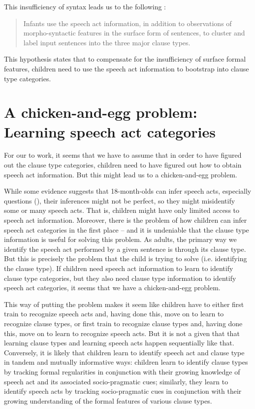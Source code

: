 This insufficiency of syntax leads us to the following \tbf{\subhypos{}}:
\begin{quote}
Infants use the speech act information, in addition to observations of morpho-syntactic features in the surface form of sentences, to cluster and label input sentences into the three major clause types.
\end{quote}


This hypothesis states that to compensate for the insufficiency of surface formal features, children need to use the speech act information to bootstrap into clause type categories.



\section{A chicken-and-egg problem: Learning speech act categories}
\label{sec:intro:sp}
For our \subhypos{} to work, it seems that we have to assume that in order to have figured out the clause type categories, children need to have figured out how to obtain speech act information. But this might lead us to a chicken-and-egg problem.

While some evidence suggests that 18-month-olds can infer speech acts, especially questions (\cite{casillas2017turn, marshmallowqueen}), their inferences might not be perfect, so they might misidentify some or many speech acts. That is, children might have only limited access to speech act information. Moreover, there is the problem of how children can infer speech act categories in the first place -- and it is undeniable that the clause type information is useful for solving this problem. As adults, the primary way we identify the speech act performed by a given sentence is through its clause type. But this is precisely the problem that the child is trying to solve (i.e. identifying the clause type). If children need speech act information to learn to identify clause type categories, but they also need clause type information to identify speech act categories, it seems that we have a chicken-and-egg problem. 

This way of putting the problem makes it seem like children have to either first train to recognize speech acts and, having done this, move on to learn to recognize clause types, or first train to recognize clause types and, having done this, move on to learn to recognize speech acts. But it is not a given that 
that learning clause types and learning speech acts happen sequentially like that. Conversely, it is likely that children learn to identify speech act and clause type in tandem and mutually informative ways: children learn to identify clause types by tracking formal regularities in conjunction with their growing
knowledge of speech act and its associated socio-pragmatic cues; similarly, they learn
to identify speech acts by tracking socio-pragmatic cues in conjunction with their growing
understanding of the formal features of various clause types.


